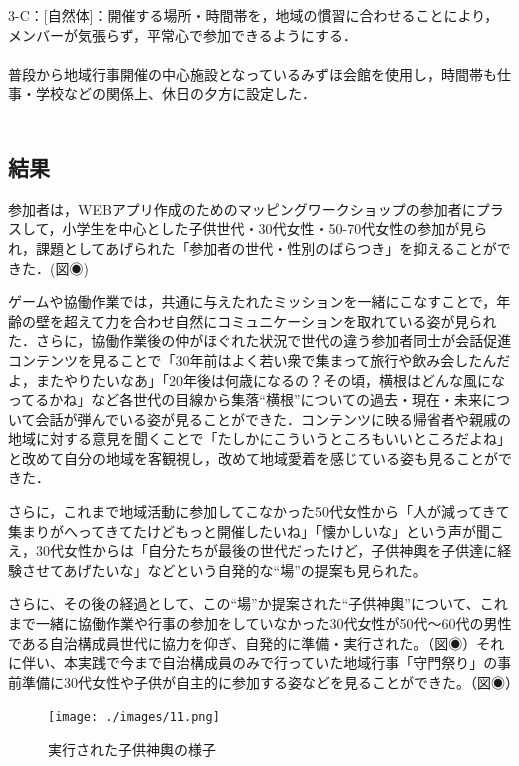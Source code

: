 \documentclass[a4paper]{jsarticle}
\begin{document}
3-C：[自然体]：開催する場所・時間帯を，地域の慣習に合わせることにより，メンバーが気張らず，平常心で参加できるようにする．\\\\
普段から地域行事開催の中心施設となっているみずほ会館を使用し，時間帯も仕事・学校などの関係上、休日の夕方に設定した．\\\\
\subsection{結果}
参加者は，WEBアプリ作成のためのマッピングワークショップの参加者にプラスして，小学生を中心とした子供世代・30代女性・50-70代女性の参加が見られ，課題としてあげられた「参加者の世代・性別のばらつき」を抑えることができた．(図◉)\par
ゲームや協働作業では，共通に与えたれたミッションを一緒にこなすことで，年齢の壁を超えて力を合わせ自然にコミュニケーションを取れている姿が見られた．さらに，協働作業後の仲がほぐれた状況で世代の違う参加者同士が会話促進コンテンツを見ることで「30年前はよく若い衆で集まって旅行や飲み会したんだよ，またやりたいなあ」「20年後は何歳になるの？その頃，横根はどんな風になってるかね」など各世代の目線から集落“横根”についての過去・現在・未来について会話が弾んでいる姿が見ることができた．コンテンツに映る帰省者や親戚の地域に対する意見を聞くことで「たしかにこういうところもいいところだよね」と改めて自分の地域を客観視し，改めて地域愛着を感じている姿も見ることができた．\par
さらに，これまで地域活動に参加してこなかった50代女性から「人が減ってきて集まりがへってきてたけどもっと開催したいね」「懐かしいな」という声が聞こえ，30代女性からは「自分たちが最後の世代だったけど，子供神輿を子供達に経験させてあげたいな」などという自発的な“場”の提案も見られた。\par
さらに、その後の経過として、この“場”か提案された“子供神輿”について、これまで一緒に協働作業や行事の参加をしていなかった30代女性が50代〜60代の男性である自治構成員世代に協力を仰ぎ、自発的に準備・実行された。（図◉）それに伴い、本実践で今まで自治構成員のみで行っていた地域行事「守門祭り」の事前準備に30代女性や子供が自主的に参加する姿などを見ることができた。（図◉）

\begin{figure}[H]
  \begin{center}
    \texttt{[image: ./images/11.png]}
    \caption{実行された子供神輿の様子}
    \label{fig:tmu_hino}
  \end{center}
\end{figure}
\end{document}
